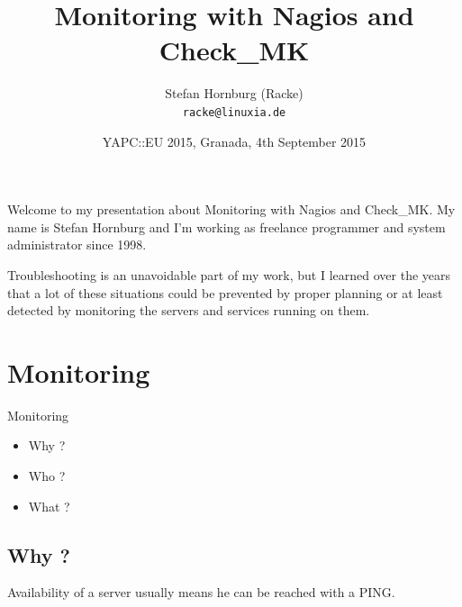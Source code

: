 \usepackage[utf8]{inputenc}
\usepackage[T1]{fontenc}
\usepackage{mathptmx}
\usepackage[scaled=.90]{helvet}
\usepackage{courier}
\usepackage{caption}
\captionsetup{labelformat=empty,labelsep=none}
\usepackage{verbatim}
\usepackage{hyperref}
\usepackage{listings}
\usepackage{ulem}
\lstset{language=Perl,basicstyle=\normalsize,tabsize=3,showstringspaces=false}

\title{Monitoring with Nagios and Check\_MK}
\author[racke]{Stefan Hornburg (Racke)\\ \texttt{racke@linuxia.de}}
\date{YAPC::EU 2015, Granada, 4th September 2015}


\maketitle{}

\begin{frame}
  \titlepage
\end{frame}

\tableofcontents


Welcome to my presentation about Monitoring with Nagios and Check\_MK.
My name is Stefan Hornburg and I'm working as freelance programmer
and system administrator since 1998.

Troubleshooting is an unavoidable part of my work, but I learned
over the years that a lot of these situations could be prevented
by proper planning or at least detected by monitoring the servers
and services running on them.

\section{Monitoring}

\begin{frame}[fragile]{Monitoring}

\begin{itemize}
\item Why ?
\item Who ?
\item What ?
\end{itemize}
\end{frame}

\subsection{Why ?}

Availability of a server usually means he can be reached with a PING.

